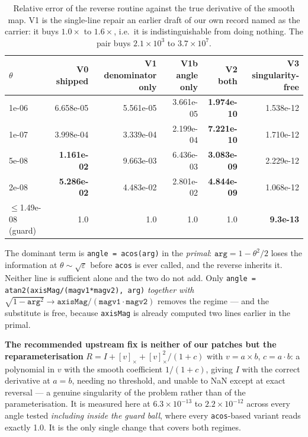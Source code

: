 \documentclass[11pt,a4paper]{article}
\begin{document}
\begin{table}[htbp]
\centering\footnotesize
\begin{tabular}{@{}lrrrrr@{}}
\toprule
\(\theta\) & V0 shipped & V1 denominator only & V1b angle only & V2 both & V3 singularity-free \\
\midrule
1e-06 & 6.658e-05 & 5.561e-05 & 3.661e-05 & \textbf{1.974e-10} & 1.538e-12 \\
1e-07 & 3.998e-04 & 3.339e-04 & 2.199e-04 & \textbf{7.221e-10} & 1.710e-12 \\
5e-08 & \textbf{1.161e-02} & 9.663e-03 & 6.436e-03 & \textbf{3.083e-09} & 2.229e-12 \\
2e-08 & \textbf{5.286e-02} & 4.483e-02 & 2.801e-02 & \textbf{4.844e-09} & 1.068e-12 \\
\(\le\)1.49e-08 (guard) & 1.0 & 1.0 & 1.0 & 1.0 & \textbf{9.3e-13} \\
\bottomrule
\end{tabular}
\caption{Relative error of the reverse routine against the true derivative of the smooth map.
V1 is the single-line repair an earlier draft of our own record named as the carrier: it buys
\(1.0\times\) to \(1.6\times\), i.e.\ it is indistinguishable from doing nothing. The pair
buys \(2.1\times10^{3}\) to \(3.7\times10^{7}\).}
\end{table}

The dominant term is \texttt{angle = acos(arg)} in the \emph{primal}: \(\texttt{arg} = 1 -
\theta^2/2\) loses the information at \(\theta\sim\sqrt{\varepsilon}\) before \texttt{acos} is
ever called, and the reverse inherits it. Neither line is sufficient alone and the two do not
add. Only \texttt{angle = atan2(axisMag/(magv1*magv2), arg)} \emph{together with}
\(\sqrt{1-\texttt{arg}^2} \rightarrow \texttt{axisMag}/(\texttt{magv1}\cdot\texttt{magv2})\)
removes the regime --- and the substitute is free, because \texttt{axisMag} is already
computed two lines earlier in the primal.

\textbf{The recommended upstream fix is neither of our patches but the reparameterisation}
\(R = I + [v]_\times + [v]_\times^2/(1+c)\) with \(v = a\times b\), \(c = a\cdot b\): a
polynomial in \(v\) with the smooth coefficient \(1/(1+c)\), giving \(I\) with the correct
derivative at \(a = b\), needing no threshold, and unable to NaN except at exact reversal ---
a genuine singularity of the problem rather than of the parameterisation. It is measured here
at \(6.3\times10^{-13}\) to \(2.2\times10^{-12}\) across every angle tested \emph{including
inside the guard ball}, where every \texttt{acos}-based variant reads exactly 1.0. It is the
only single change that covers both regimes.
\end{document}
